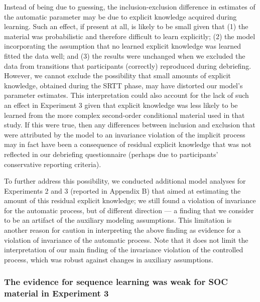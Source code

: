 \documentclass[man]{apa6}
\theoremstyle{definition}
\theoremstyle{definition}
\theoremstyle{definition}
\theoremstyle{remark}
\begin{document}
Instead of being due to guessing, the inclusion-exclusion difference in
estimates of the automatic parameter may be due to explicit knowledge
acquired during learning. Such an effect, if present at all, is likely
to be small given that (1) the material was probabilistic and therefore
difficult to learn explicitly; (2) the model incorporating the
assumption that no learned explicit knowledge was learned fitted the
data well; and (3) the results were unchanged when we excluded the data
from transitions that participants (correctly) reproduced during
debriefing. However, we cannot exclude the possibility that small
amounts of explicit knowledge, obtained during the SRTT phase, may have
distorted our model's parameter estimates. This interpretation could
also account for the lack of such an effect in Experiment 3 given that
explicit knowledge was less likely to be learned from the more complex
second-order conditional material used in that study. If this were true,
then any differences between inclusion and exclusion that were
attributed by the model to an invariance violation of the implicit
process may in fact have been a consequence of residual explicit
knowledge that was not reflected in our debriefing questionnaire
(perhaps due to participants' conservative reporting criteria).

To further address this possibility, we conducted additional model
analyses for Experiments 2 and 3 (reported in Appendix B) that aimed at
estimating the amount of this residual explicit knowledge; we still
found a violation of invariance for the automatic process, but of
different direction --- a finding that we consider to be an artifact of
the auxiliary modeling assumptions. This limitation is another reason
for caution in interpreting the above finding as evidence for a
violation of invariance of the automatic process. Note that it does not
limit the interpretation of our main finding of the invariance violation
of the controlled process, which was robust against changes in auxiliary
assumptions.

\subsubsection{The evidence for sequence learning was weak for SOC
material in Experiment
3}\label{the-evidence-for-sequence-learning-was-weak-for-soc-material-in-experiment-3}
\end{document}
